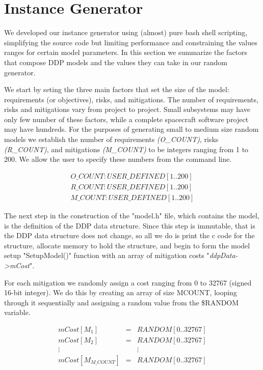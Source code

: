 \section{Instance Generator} 

We developed our instance generator using (almost) pure bash shell scripting,
simplifying the source code but limiting performance and constraining the values
ranges for certain model parameters. In this section we summarize the factors
that compose DDP models and the values they can take in our random generator.

We start by seting the three main factors that set the size of the model: 
requirements (or
objectives), risks, and mitigations. The number of requirements, risks and
mitigations vary from project to project. Small subsystems may have only few
number of these factors, while a complete spacecraft software project may have
hundreds. For the purposes of generating small to medium size
random models we establish the number of requirements \textit{(O\_COUNT)}, risks
\textit{(R\_COUNT)}, and mitigations \textit{(M\_COUNT)} to be integers ranging
from 1 to 200. We allow the user to specify these numbers from the command line.

\begin{footnotesize}
\begin{eqnarray*}
O\_COUNT: USER\_DEFINED[1..200]\\
R\_COUNT: USER\_DEFINED[1..200]\\
M\_COUNT: USER\_DEFINED[1..200] 
\end{eqnarray*}
\end{footnotesize}

The next step in the construction of the "model.h" file, which contains the model,
is the definition of the DDP data structure. Since this step is immutable, that is
the DDP data structure does not change, so all we do is print the c code for the
structure, allocate memory to hold the structure, and begin to form the model setup
"SetupModel()" function with an array
of mitigation costs "\textit{ddpData->mCost}".
  
For each mitigation we randomly assign a cost ranging from 0 to 32767 (signed
16-bit integer). We do this by creating an array of size MCOUNT, looping through
it sequentially and assigning a random value from the \$RANDOM variable.

\begin{footnotesize}\begin{eqnarray*}
mCost[M_1]&=&RANDOM[0..32767]\\
mCost[M_2]&=&RANDOM[0..32767]\\
\vdots & & \vdots \\
mCost[M_{M\_COUNT}]&=&RANDOM[0..32767] 
\end{eqnarray*}\end{footnotesize}

